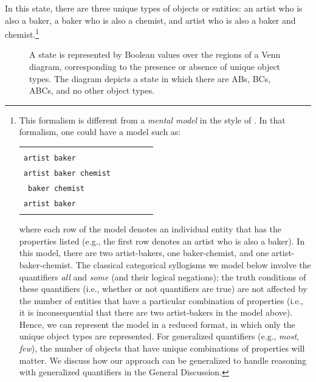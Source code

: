 \documentclass[floatsintext, man]{apa6}
\def\firstcircle{(90:1cm) circle (1.5cm)}
\def\secondcircle{(210:1cm) circle (1.5cm)}
\def\thirdcircle{(330:1cm) circle (1.5cm)}
\begin{document}
\noindent In this state, there are three unique types of objects or entities: an artist who is also a baker, a baker who is also a chemist, and artist who is also a baker and chemist.\footnote{
This formalism is different from a \emph{mental model} in the style of  . In that formalism, one could have a model such as:

\begin{tabularx}{.8\textwidth}{XXXXX}
& \\
\tt artist baker \\
\tt artist baker chemist \\
\tt \hspace{1cm} baker chemist \\
\tt artist baker \\
& \\
\end{tabularx}

\noindent where each row of the model denotes an individual entity that has the properties listed (e.g., the first row denotes an artist who is also a baker).
In this model, there are two artist-bakers, one baker-chemist, and one artist-baker-chemist.
The classical categorical syllogisms we model below involve the quantifiers \emph{all} and \emph{some} (and their logical negations); the truth conditions of these quantifiers (i.e., whether or not quantifiers are true) are not affected by the number of entities that have a particular combination of properties (i.e., it is inconsequential that there are two artist-bakers in the model above).
Hence, we can represent the model in a reduced format, in which only the unique object types are represented.
For generalized quantifiers (e.g., \emph{most}, \emph{few}), the number of objects that have unique combinations of properties will matter. We discuss how our approach can be generalized to handle reasoning with generalized quantifiers in the General Discussion.
}


\begin{figure}[h]
\centering
\label{fig:venn}
\caption{A state is represented by Boolean values over the regions of a Venn diagram, corresponding to the presence or absence of unique object types. The diagram depicts a state in which there are ABs, BCs, ABCs, and no other object types.}
\end{figure}
\end{document}
